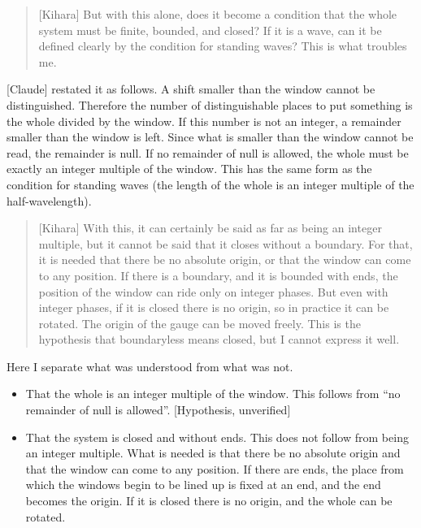 \documentclass[
  a4paper,
]{article}
\providecommand{\tightlist}{%
  \setlength{\itemsep}{0pt}\setlength{\parskip}{0pt}}
\begin{document}
\begin{quote}
{[}Kihara{]} But with this alone, does it become a condition that the
whole system must be finite, bounded, and closed? If it is a wave, can
it be defined clearly by the condition for standing waves? This is what
troubles me.
\end{quote}

{[}Claude{]} restated it as follows. A shift smaller than the window
cannot be distinguished. Therefore the number of distinguishable places
to put something is the whole divided by the window. If this number is
not an integer, a remainder smaller than the window is left. Since what
is smaller than the window cannot be read, the remainder is null. If no
remainder of null is allowed, the whole must be exactly an integer
multiple of the window. This has the same form as the condition for
standing waves (the length of the whole is an integer multiple of the
half-wavelength).

\begin{quote}
{[}Kihara{]} With this, it can certainly be said as far as being an
integer multiple, but it cannot be said that it closes without a
boundary. For that, it is needed that there be no absolute origin, or
that the window can come to any position. If there is a boundary, and it
is bounded with ends, the position of the window can ride only on
integer phases. But even with integer phases, if it is closed there is
no origin, so in practice it can be rotated. The origin of the gauge can
be moved freely. This is the hypothesis that boundaryless means closed,
but I cannot express it well.
\end{quote}

Here I separate what was understood from what was not.

\begin{itemize}
\tightlist
\item
  That the whole is an integer multiple of the window. This follows from
  ``no remainder of null is allowed''. {[}Hypothesis, unverified{]}
\item
  That the system is closed and without ends. This does not follow from
  being an integer multiple. What is needed is that there be no absolute
  origin and that the window can come to any position. If there are
  ends, the place from which the windows begin to be lined up is fixed
  at an end, and the end becomes the origin. If it is closed there is no
  origin, and the whole can be rotated.
\end{itemize}
\end{document}
